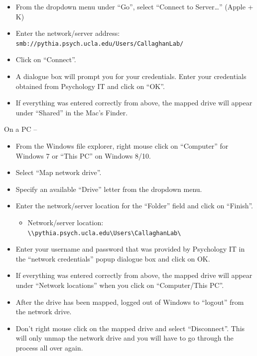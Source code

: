 \documentclass[
]{book}
\providecommand{\tightlist}{%
  \setlength{\itemsep}{0pt}\setlength{\parskip}{0pt}}
\begin{document}
\begin{itemize}
\tightlist
\item
  From the dropdown menu under ``Go'', select ``Connect to Server\ldots{}'' (Apple + K)
\item
  Enter the network/server address: \texttt{smb://pythia.psych.ucla.edu/Users/CallaghanLab/}
\item
  Click on ``Connect''.
\item
  A dialogue box will prompt you for your credentials. Enter your credentials obtained from Psychology IT and click on ``OK''.
\item
  If everything was entered correctly from above, the mapped drive will appear under ``Shared'' in the Mac's Finder.
\end{itemize}

On a PC --

\begin{itemize}
\tightlist
\item
  From the Windows file explorer, right mouse click on ``Computer'' for Windows 7 or ``This PC'' on Windows 8/10.
\item
  Select ``Map network drive''.
\item
  Specify an available ``Drive'' letter from the dropdown menu.
\item
  Enter the network/server location for the ``Folder'' field and click on ``Finish''.

  \begin{itemize}
  \tightlist
  \item
    Network/server location: \texttt{\textbackslash{}\textbackslash{}pythia.psych.ucla.edu\textbackslash{}Users\textbackslash{}CallaghanLab\textbackslash{}}
  \end{itemize}
\item
  Enter your username and password that was provided by Psychology IT in the ``network credentials'' popup dialogue box and click on OK.
\item
  If everything was entered correctly from above, the mapped drive will appear under ``Network locations'' when you click on ``Computer/This PC''.
\item
  After the drive has been mapped, logged out of Windows to ``logout'' from the network drive.
\item
  Don't right mouse click on the mapped drive and select ``Disconnect''. This will only unmap the network drive and you will have to go through the process all over again.
\end{itemize}
\end{document}
